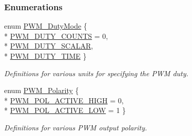 \subsubsection*{Enumerations}
\begin{DoxyCompactItemize}
\item 
enum \hyperlink{_p_w_m_8h_a6c5ba2703cb9cc02773b5073046c1607}{P\-W\-M\-\_\-\-Duty\-Mode} \{ \\*
\hyperlink{_p_w_m_8h_a6c5ba2703cb9cc02773b5073046c1607a4a20018a9620ed669dff0893858a44b2}{P\-W\-M\-\_\-\-D\-U\-T\-Y\-\_\-\-C\-O\-U\-N\-T\-S} = 0, 
\\*
\hyperlink{_p_w_m_8h_a6c5ba2703cb9cc02773b5073046c1607a2611c911a0eba0b814c8da5e464d2864}{P\-W\-M\-\_\-\-D\-U\-T\-Y\-\_\-\-S\-C\-A\-L\-A\-R}, 
\\*
\hyperlink{_p_w_m_8h_a6c5ba2703cb9cc02773b5073046c1607a4e450c41a62390183087c6ec32e65bd5}{P\-W\-M\-\_\-\-D\-U\-T\-Y\-\_\-\-T\-I\-M\-E}
 \}
\begin{DoxyCompactList}\small\item\em Definitions for various units for specifying the P\-W\-M duty. \end{DoxyCompactList}\item 
enum \hyperlink{_p_w_m_8h_affa60cc974f99db4aeafc9f6524ec593}{P\-W\-M\-\_\-\-Polarity} \{ \\*
\hyperlink{_p_w_m_8h_affa60cc974f99db4aeafc9f6524ec593a9a0765651cee5c3bb3f4ca3dc87a328e}{P\-W\-M\-\_\-\-P\-O\-L\-\_\-\-A\-C\-T\-I\-V\-E\-\_\-\-H\-I\-G\-H} = 0, 
\\*
\hyperlink{_p_w_m_8h_affa60cc974f99db4aeafc9f6524ec593a4862fe820788c4fec725cc91db2649c5}{P\-W\-M\-\_\-\-P\-O\-L\-\_\-\-A\-C\-T\-I\-V\-E\-\_\-\-L\-O\-W} = 1
 \}
\begin{DoxyCompactList}\small\item\em Definitions for various P\-W\-M output polarity. \end{DoxyCompactList}\end{DoxyCompactItemize}
